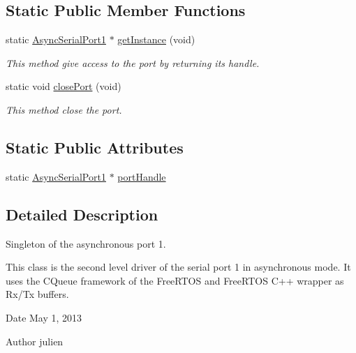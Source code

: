 \subsection*{\-Static \-Public \-Member \-Functions}
\begin{DoxyCompactItemize}
\item 
static \hyperlink{class_async_serial_port1}{\-Async\-Serial\-Port1} $\ast$ \hyperlink{class_async_serial_port1_a1c767b7bdd824c5b3fd4cdaa3dfc2081}{get\-Instance} (void)
\begin{DoxyCompactList}\small\item\em \-This method give access to the port by returning its handle. \end{DoxyCompactList}\item 
static void \hyperlink{class_async_serial_port1_a2dd7f83163710334d2dc5be1e53812be}{close\-Port} (void)
\begin{DoxyCompactList}\small\item\em \-This method close the port. \end{DoxyCompactList}\end{DoxyCompactItemize}
\subsection*{\-Static \-Public \-Attributes}
\begin{DoxyCompactItemize}
\item 
static \hyperlink{class_async_serial_port1}{\-Async\-Serial\-Port1} $\ast$ \hyperlink{class_async_serial_port1_a9661343083970644038cc10ba8e3d0a5}{port\-Handle}
\end{DoxyCompactItemize}


\subsection{\-Detailed \-Description}
\-Singleton of the asynchronous port 1. 

\-This class is the second level driver of the serial port 1 in asynchronous mode. \-It uses the \-C\-Queue framework of the \-Free\-R\-T\-O\-S and \-Free\-R\-T\-O\-S \-C++ wrapper as \-Rx/\-Tx buffers.

\begin{DoxyDate}{\-Date}
\-May 1, 2013 
\end{DoxyDate}
\begin{DoxyAuthor}{\-Author}
julien 
\end{DoxyAuthor}


